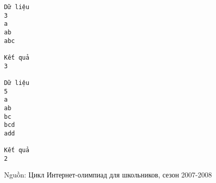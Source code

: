 \begin{verbatim}
Dữ liệu
3
a
ab
abc

Kết quả
3

Dữ liệu
5
a
ab
bc
bcd
add

Kết quả
2
\end{verbatim}

   Nguồn: Цикл Интернет-олимпиад для школьников, сезон 2007-2008